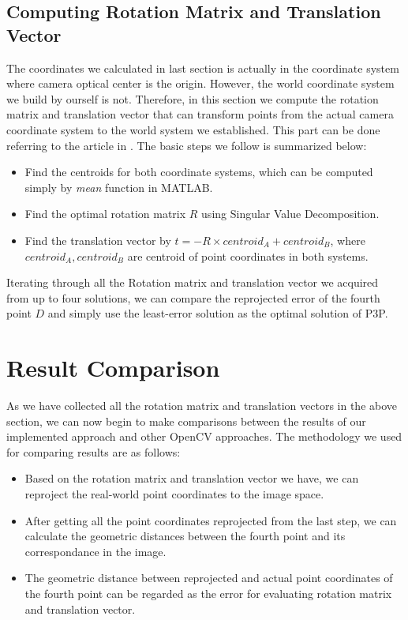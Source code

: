 \documentclass[conference]{IEEEtran}
\begin{document}
\subsection{Computing Rotation Matrix and Translation Vector}
The coordinates we calculated in last section is actually in the coordinate system where camera optical center is the origin. However, the world coordinate system we build by ourself is not. Therefore, in this section we compute the rotation matrix and translation vector that can transform points from the actual camera coordinate system to the world system we established. This part can be done 
referring to the article in \cite{optimaltrans} \cite{besl1992method}. The basic steps we follow is summarized below:
\begin{itemize}
	\item Find the centroids for both coordinate systems, which can be computed simply by \emph{mean} function in MATLAB.
	\item Find the optimal rotation matrix $R$ using Singular Value Decomposition.
	\item Find the translation vector by $t = -R\times centroid_A + centroid_B$, where $centroid_A, centroid_B$ are centroid of point coordinates in both systems.
\end{itemize}

Iterating through all the Rotation matrix and translation vector we acquired from up to four solutions, we can compare the reprojected error of the fourth point $D$ and simply use the least-error solution as the optimal solution of P3P.


\section{Result Comparison}
As we have collected all the rotation matrix and translation vectors in the above section, we can now begin to make comparisons between the results of our implemented approach and other OpenCV approaches. The methodology we used for comparing results are as follows:
\begin{itemize}
	\item Based on the rotation matrix and translation vector we have, we can reproject the real-world point coordinates to the image space.
	\item After getting all the point coordinates reprojected from the last step, we can calculate the geometric distances between the fourth point and its correspondance in the image.
	\item The geometric distance between reprojected and actual point coordinates of the fourth point can be regarded as the error for evaluating rotation matrix and translation vector.
\end{itemize}
\end{document}
